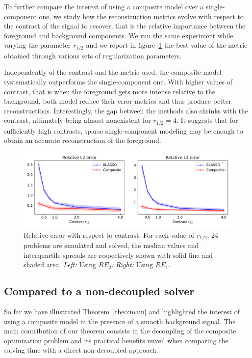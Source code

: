         To further compare the interest of using a composite model over a single-component one, we study how the reconstruction metrics evolve with respect to the contrast of the signal to recover, that is the relative importance between the foreground and background components. We run the same experiment while varying the parameter $r_{1/2}$ and we report in figure~\ref{fig:bench:metrics-vs-r} the best value of the metric obtained through various sets of regularization parameters.

        Independently of the contrast and the metric used, the composite model systematically outperforms the single-component one. With higher values of contrast, that is when the foreground gets more intense relative to the background, both model reduce their error metrics and thus produce better reconstructions. Interestingly, the gap between the methods also shrinks with the contrast, ultimately being almost nonexistent for $r_{1/2} = 4$. It suggests that for sufficiently high contrasts, sparse single-component modeling may be enough to obtain an accurate reconstruction of the foreground.

        \begin{figure}[t]
            \centering
            \includegraphics[width=\linewidth]{figures/benchmark/error_vs_r12.pdf}        
            \caption{Relative error with respect to contrast. For each value of $r_{1/2}$, 24 problems are simulated and solved, the median values and interquartile spreads are respectively shown with solid line and shaded area. \textit{Left:} Using $RE_2$. \textit{Right:} Using $RE_1$.}
            \label{fig:bench:metrics-vs-r}
        \end{figure}


    \subsection{Compared to a non-decoupled solver}
    \label{sec:bene:deco}
        So far we have illustrated Theorem~\ref{theo:main} and highlighted the interest of using a composite model in the presence of a smooth background signal. The main contribution of our theorem consists in the decoupling of the composite optimization problem and its practical benefits unveil when comparing the solving time with a direct non-decoupled approach. 

